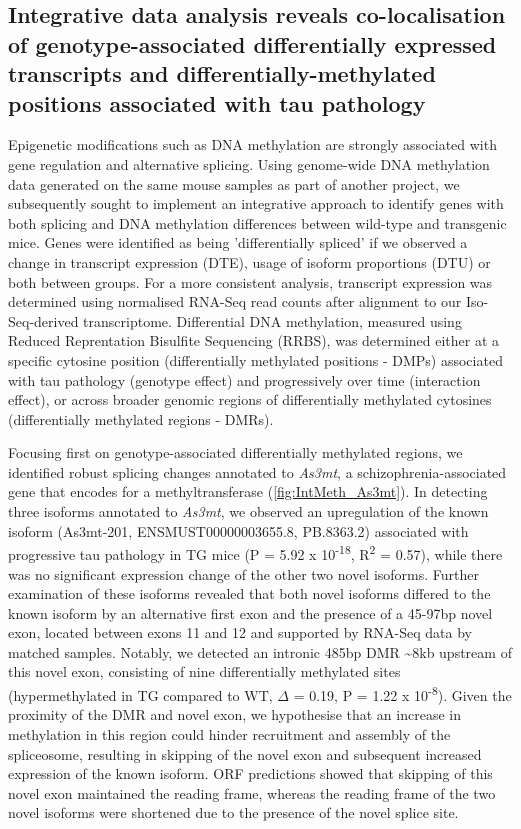 \clearpage
\subsection{Integrative data analysis reveals co-localisation of genotype-associated differentially expressed transcripts and differentially-methylated positions associated with tau pathology}
Epigenetic modifications such as DNA methylation are strongly associated with gene regulation and alternative splicing. Using genome-wide DNA methylation data generated on the same mouse samples as part of another project, we subsequently sought to implement an integrative approach to identify genes with both splicing and DNA methylation differences between wild-type and transgenic mice. Genes were identified as being 'differentially spliced' if we observed a change in transcript expression (DTE), usage of isoform proportions (DTU) or both between groups. For a more consistent analysis, transcript expression was determined using normalised RNA-Seq read counts after alignment to our Iso-Seq-derived transcriptome. Differential DNA methylation, measured using Reduced Reprentation Bisulfite Sequencing (RRBS), was determined either at a specific cytosine position (differentially methylated positions - DMPs) associated with tau pathology (genotype effect) and progressively over time (interaction effect), or across broader genomic regions of differentially methylated cytosines (differentially methylated regions - DMRs). 

Focusing first on genotype-associated differentially methylated regions, we identified robust splicing changes annotated to \textit{As3mt}, a schizophrenia-associated gene that encodes for a methyltransferase (\cref{fig:IntMeth_As3mt}). In detecting three isoforms annotated to \textit{As3mt}, we observed an upregulation of the known isoform (As3mt-201, ENSMUST00000003655.8, PB.8363.2) associated with progressive tau pathology in TG mice (P = 5.92 x 10\textsuperscript{-18}, R\textsuperscript{2} = 0.57), while there was no significant expression change of the other two novel isoforms. Further examination of these isoforms revealed that both novel isoforms differed to the known isoform by an alternative first exon and the presence of a 45-97bp novel exon, located between exons 11 and 12 and supported by RNA-Seq data by matched samples. Notably, we detected an intronic 485bp DMR \textasciitilde{}8kb upstream of this novel exon, consisting of nine differentially methylated sites (hypermethylated in TG compared to WT, $\Delta$ = 0.19, P = 1.22 x 10\textsuperscript{-8}). Given the proximity of the DMR and novel exon, we hypothesise that an increase in methylation in this region could hinder recruitment and assembly of the spliceosome, resulting in skipping of the novel exon and subsequent increased expression of the known isoform. ORF predictions showed that skipping of this novel exon maintained the reading frame, whereas the reading frame of the two novel isoforms were shortened due to the presence of the novel splice site. 


